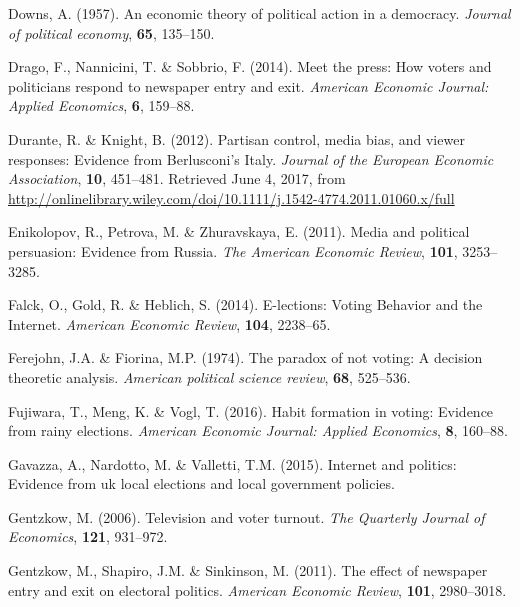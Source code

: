 \documentclass[
  12pt,
]{article}
\begin{document}
\leavevmode\hypertarget{ref-downs_economic_1957}{}%
Downs, A. (1957). An economic theory of political action in a democracy.
\emph{Journal of political economy}, \textbf{65}, 135--150.

\leavevmode\hypertarget{ref-drago_meet_2014}{}%
Drago, F., Nannicini, T. \& Sobbrio, F. (2014). Meet the press: How
voters and politicians respond to newspaper entry and exit.
\emph{American Economic Journal: Applied Economics}, \textbf{6},
159--88.

\leavevmode\hypertarget{ref-durante_partisan_2012}{}%
Durante, R. \& Knight, B. (2012). Partisan control, media bias, and
viewer responses: Evidence from Berlusconi's Italy. \emph{Journal of the
European Economic Association}, \textbf{10}, 451--481. Retrieved June 4,
2017, from
\url{http://onlinelibrary.wiley.com/doi/10.1111/j.1542-4774.2011.01060.x/full}

\leavevmode\hypertarget{ref-enikolopov_media_2011}{}%
Enikolopov, R., Petrova, M. \& Zhuravskaya, E. (2011). Media and
political persuasion: Evidence from Russia. \emph{The American Economic
Review}, \textbf{101}, 3253--3285.

\leavevmode\hypertarget{ref-falck_e-lections:_2014}{}%
Falck, O., Gold, R. \& Heblich, S. (2014). E-lections: Voting Behavior
and the Internet. \emph{American Economic Review}, \textbf{104},
2238--65.

\leavevmode\hypertarget{ref-ferejohn_paradox_1974}{}%
Ferejohn, J.A. \& Fiorina, M.P. (1974). The paradox of not voting: A
decision theoretic analysis. \emph{American political science review},
\textbf{68}, 525--536.

\leavevmode\hypertarget{ref-fujiwara_habit_2016}{}%
Fujiwara, T., Meng, K. \& Vogl, T. (2016). Habit formation in voting:
Evidence from rainy elections. \emph{American Economic Journal: Applied
Economics}, \textbf{8}, 160--88.

\leavevmode\hypertarget{ref-gavazza_internet_2015}{}%
Gavazza, A., Nardotto, M. \& Valletti, T.M. (2015). Internet and
politics: Evidence from uk local elections and local government
policies.

\leavevmode\hypertarget{ref-gentzkow_television_2006}{}%
Gentzkow, M. (2006). Television and voter turnout. \emph{The Quarterly
Journal of Economics}, \textbf{121}, 931--972.

\leavevmode\hypertarget{ref-gentzkow_effect_2011}{}%
Gentzkow, M., Shapiro, J.M. \& Sinkinson, M. (2011). The effect of
newspaper entry and exit on electoral politics. \emph{American Economic
Review}, \textbf{101}, 2980--3018.
\end{document}
